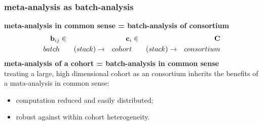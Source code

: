 \documentclass{beamer}
\begin{document}
\begin{frame}\frametitle{meta-analysis as batch-analysis}
  \textbf{meta-analysis in common sense = batch-analysis of consortium}
  \begin{align*}
    \mathbf{b}_{ij} & \in & \mathbf{c}_i  & \in & \mathbf{C} \\
    batch    & \qquad(stack)\to & cohort & \qquad(stack)\to & consortium
  \end{align*}
  \textbf{meta-analysis of a cohort = batch-analysis in common sense} \\
  treating a large, high dimensional cohort as an consortium inherits the benefits of a mata-analysis
  in common sense: \\
  \begin{itemize}
  \item computation reduced and easily distributed; 
  \item robust against within cohort heterogeneity.
  \end{itemize}
\end{frame}
\end{document}
